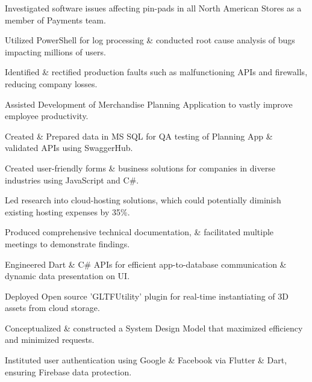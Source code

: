 \documentclass[]{deedy-resume-openfont}
\begin{document}
\begin{tightemize}
\item Investigated software issues affecting pin-pads in all North American Stores as a member of Payments team.
\item Utilized PowerShell for log processing \& conducted root cause analysis of bugs impacting millions of users.
\item Identified \& rectified production faults such as malfunctioning APIs and firewalls, reducing company losses.
\item Assisted Development of Merchandise Planning Application to vastly improve employee productivity. 
\item Created \& Prepared data in MS SQL for QA testing of Planning App \& validated APIs using SwaggerHub.
\end{tightemize}
\sectionsep

\begin{tightemize}
\item Created user-friendly forms \& business solutions for companies in diverse industries using JavaScript and C\#.
\item Led research into cloud-hosting solutions, which could potentially diminish existing hosting expenses by 35\%.
\item Produced comprehensive technical documentation, \& facilitated multiple meetings to demonstrate findings.
\end{tightemize}




\begin{tightemize}
\item Engineered Dart \& C\# APIs for efficient app-to-database communication \& dynamic data presentation on UI.
\item Deployed Open source 'GLTFUtility' plugin for real-time instantiating of 3D assets from cloud storage.
\item Conceptualized \& constructed a System Design Model that maximized efficiency and minimized requests.
\item Instituted user authentication using Google \& Facebook via Flutter \& Dart, ensuring Firebase data protection.
\end{tightemize}
\sectionsep
\end{document}
